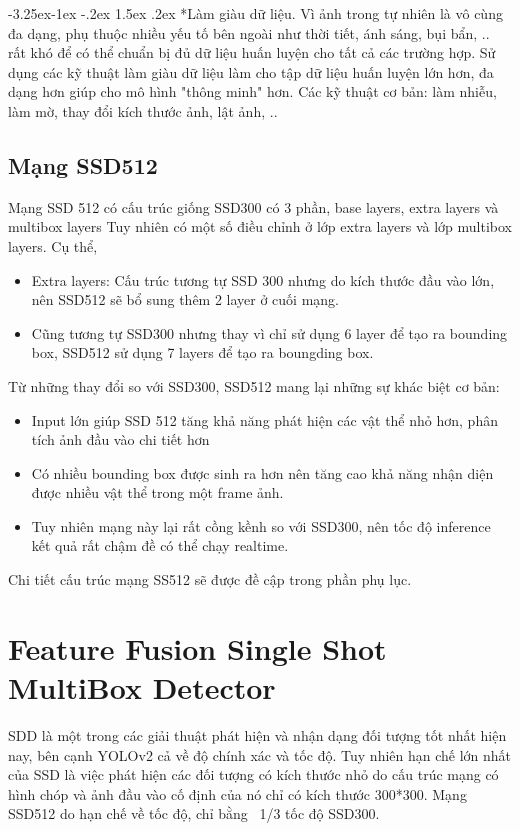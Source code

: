\documentclass[a4paper]{report}
\makeatletter
\newcounter {subsubsubsection}[subsubsection]
\newcommand\subsubsubsection{\@startsection{subsubsubsection}{4}{\z@}%
                                     {-3.25ex\@plus -1ex \@minus -.2ex}%
                                     {1.5ex \@plus .2ex}%
                                     {\normalfont\normalsize\bfseries}}
\makeatother
\begin{document}
\subsubsubsection*{Làm giàu dữ liệu. } Vì ảnh trong tự nhiên là vô cùng đa dạng, phụ thuộc nhiều yếu tố bên ngoài như thời tiết, ánh sáng, bụi bẩn, .. rất khó để có thể chuẩn bị đủ dữ liệu huấn luyện cho tất cả các trường hợp. Sử dụng các kỹ thuật làm giàu dữ liệu làm cho tập dữ liệu huấn luyện lớn hơn, đa dạng hơn giúp cho mô hình "thông minh" hơn. Các kỹ thuật cơ bản: làm nhiễu, làm mờ, thay đổi kích thước ảnh, lật ảnh, .. 

\subsection{Mạng SSD512}
Mạng SSD 512 có cấu trúc giống SSD300 có 3 phần, base layers, extra layers và multibox layers
Tuy nhiên có một số điều chỉnh ở lớp extra layers và lớp multibox layers. Cụ thể,
\begin{itemize} 
\item Extra layers: Cấu trúc tương tự SSD 300 nhưng do kích thước đầu vào lớn, nên SSD512 
sẽ bổ sung thêm 2 layer ở cuối mạng.
\item Cũng tương tự SSD300 nhưng thay vì chỉ sử dụng 6 layer để tạo ra bounding box, SSD512 sử dụng 7 layers để tạo ra boungding box.
\end{itemize}

Từ những thay đổi so với SSD300, SSD512 mang lại những sự khác biệt cơ bản:
\begin{itemize} 
	\item Input lớn giúp SSD 512 tăng khả năng phát hiện các vật thể nhỏ hơn, phân tích ảnh đầu vào chi tiết hơn
	\item Có nhiều bounding box được sinh ra hơn nên tăng cao khả năng nhận diện được nhiều vật thể trong một frame ảnh.
	\item Tuy nhiên mạng này lại rất cồng kềnh so với SSD300, nên tốc độ inference kết quả rất chậm đề có thể chạy realtime.
\end{itemize}	

Chi tiết cấu trúc mạng SS512 sẽ được đề cập trong phần phụ lục. 

\section{Feature Fusion Single Shot MultiBox Detector}
SDD là một trong các giải thuật phát hiện và nhận dạng đối tượng tốt nhất hiện nay, bên cạnh YOLOv2 cả về độ chính xác và tốc độ. Tuy nhiên hạn chế lớn nhất của SSD là việc phát hiện các đối tượng có kích thước nhỏ do cấu trúc mạng có hình chóp và ảnh đầu vào cố định của nó chỉ có kích thước 300*300. Mạng SSD512 do hạn chế về tốc độ, chỉ bằng ~1/3 tốc độ SSD300.
\\
\end{document}
